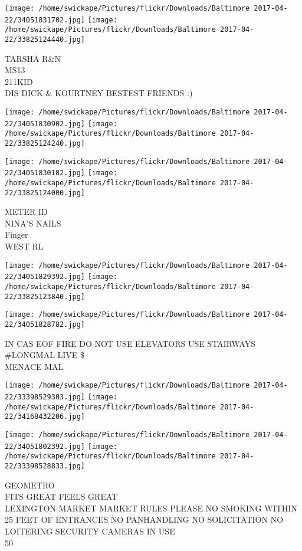 \documentclass[10pt,letterpaper]{article}
\begin{document}
\texttt{[image: /home/swickape/Pictures/flickr/Downloads/Baltimore 2017-04-22/34051831702.jpg]}
\texttt{[image: /home/swickape/Pictures/flickr/Downloads/Baltimore 2017-04-22/33825124440.jpg]}

TARSHA R\&N\\
MS13\\
211KID\\
DIS DICK \& KOURTNEY BESTEST FRIENDS :)
\pagebreak

\texttt{[image: /home/swickape/Pictures/flickr/Downloads/Baltimore 2017-04-22/34051830902.jpg]}
\texttt{[image: /home/swickape/Pictures/flickr/Downloads/Baltimore 2017-04-22/33825124240.jpg]}

\texttt{[image: /home/swickape/Pictures/flickr/Downloads/Baltimore 2017-04-22/34051830182.jpg]}
\texttt{[image: /home/swickape/Pictures/flickr/Downloads/Baltimore 2017-04-22/33825124000.jpg]}

METER ID\\
NINA'S NAILS\\
Finger\\
WEST RL
\pagebreak

\texttt{[image: /home/swickape/Pictures/flickr/Downloads/Baltimore 2017-04-22/34051829392.jpg]}
\texttt{[image: /home/swickape/Pictures/flickr/Downloads/Baltimore 2017-04-22/33825123840.jpg]}

\vspace{0.25in}
\texttt{[image: /home/swickape/Pictures/flickr/Downloads/Baltimore 2017-04-22/34051828782.jpg]}

IN CAS EOF FIRE DO NOT USE ELEVATORS USE STAIRWAYS\\
\#LONGMAL LIVE \$\\
MENACE MAL
\pagebreak

\texttt{[image: /home/swickape/Pictures/flickr/Downloads/Baltimore 2017-04-22/33398529303.jpg]}
\texttt{[image: /home/swickape/Pictures/flickr/Downloads/Baltimore 2017-04-22/34168432206.jpg]}

\texttt{[image: /home/swickape/Pictures/flickr/Downloads/Baltimore 2017-04-22/34051802392.jpg]}
\texttt{[image: /home/swickape/Pictures/flickr/Downloads/Baltimore 2017-04-22/33398528833.jpg]}

GEOMETRO\\
FITS GREAT FEELS GREAT\\
LEXINGTON MARKET MARKET RULES PLEASE NO SMOKING WITHIN 25 FEET OF ENTRANCES NO PANHANDLING NO SOLICITATION NO LOITERING SECURITY CAMERAS IN USE\\
50
\pagebreak
\end{document}
